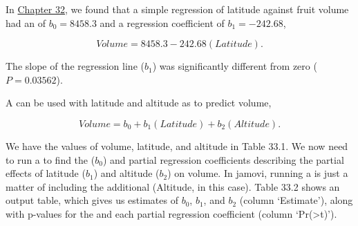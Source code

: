 \documentclass[
  openany]{krantz}
\begin{document}
In \protect\hyperlink{Chapter_32}{Chapter 32}, we found that a simple regression of latitude against fruit volume had an  of \(b_{0} = 8458.3\) and a regression coefficient of \(b_{1} = -242.68\),

\[Volume = 8458.3 - 242.68(Latitude).\]

The slope of the regression line (\(b_{1}\)) was significantly different from zero (\(P = 0.03562\)).

A  can be used with latitude and altitude as  to predict volume,

\[Volume = b_{0} + b_{1}(Latitude) + b_{2}(Altitude).\]

We have the values of volume, latitude, and altitude in Table 33.1.
We now need to run a  to find the  (\(b_{0}\)) and partial regression coefficients describing the partial effects of latitude (\(b_{1}\)) and altitude (\(b_{2}\)) on volume.
In jamovi, running a  is just a matter of including the additional  (Altitude, in this case).
Table 33.2 shows an output table, which gives us estimates of \(b_{0}\), \(b_{1}\), and \(b_{2}\) (column `Estimate'), along with p-values for the  and each partial regression coefficient (column `Pr(\textgreater\textbar t\textbar)').
\end{document}
